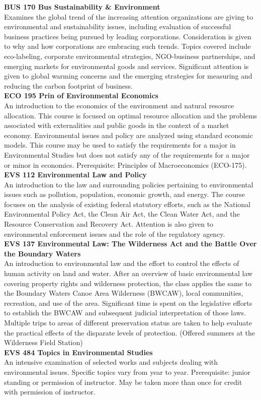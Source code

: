 \documentclass[
  letterpaper,
]{scrbook}
\begin{document}
\textbf{BUS 170 Bus Sustainability \& Environment}\\
Examines the global trend of the increasing attention organizations are
giving to environmental and sustainability issues, including evaluation
of successful business practices being pursued by leading corporations.
Consideration is given to why and how corporations are embracing such
trends. Topics covered include eco-labeling, corporate environmental
strategies, NGO-business partnerships, and emerging markets for
environmental goods and services. Significant attention is given to
global warming concerns and the emerging strategies for measuring and
reducing the carbon footprint of business.\\
\textbf{ECO 195 Prin of Environmental Economics}\\
An introduction to the economics of the environment and natural resource
allocation. This course is focused on optimal resource allocation and
the problems associated with externalities and public goods in the
context of a market economy. Environmental issues and policy are
analyzed using standard economic models. This course may be used to
satisfy the requirements for a major in Environmental Studies but does
not satisfy any of the requirements for a major or minor in economics.
Prerequisite: Principles of Macroeconomics (ECO-175).\\
\textbf{EVS 112 Environmental Law and Policy}\\
An introduction to the law and surrounding policies pertaining to
environmental issues such as pollution, population, economic growth, and
energy. The course focuses on the analysis of existing federal statutory
efforts, such as the National Environmental Policy Act, the Clean Air
Act, the Clean Water Act, and the Resource Conservation and Recovery
Act. Attention is also given to environmental enforcement issues and the
role of the regulatory agency.\\
\textbf{EVS 137 Environmental Law: The Wilderness Act and the Battle
Over the Boundary Waters}\\
An introduction to environmental law and the effort to control the
effects of human activity on land and water. After an overview of basic
environmental law covering property rights and wilderness protection,
the class applies the same to the Boundary Waters Canoe Area Wilderness
(BWCAW), local communities, recreation, and use of the area. Significant
time is spent on the legislative efforts to establish the BWCAW and
subsequent judicial interpretation of those laws. Multiple trips to
areas of different preservation status are taken to help evaluate the
practical effects of the disparate levels of protection. (Offered
summers at the Wilderness Field Station)\\
\textbf{EVS 484 Topics in Environmental Studies}\\
An intensive examination of selected works and subjects dealing with
environmental issues. Specific topics vary from year to year.
Prerequisite: junior standing or permission of instructor. May be taken
more than once for credit with permission of instructor.
\end{document}
